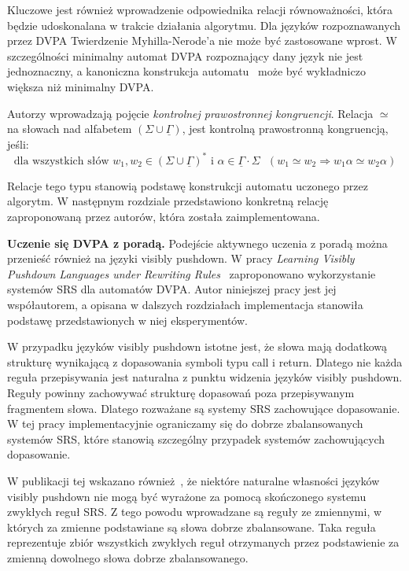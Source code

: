Kluczowe jest również wprowadzenie odpowiednika relacji równoważności, która będzie udoskonalana w trakcie działania algorytmu.
Dla języków rozpoznawanych przez DVPA Twierdzenie Myhilla-Nerode'a nie może być zastosowane wprost. W szczególności minimalny automat DVPA
rozpoznający dany język nie jest jednoznaczny, a kanoniczna konstrukcja automatu~\cite{canonical} może być wykładniczo większa niż minimalny DVPA.

Autorzy wprowadzają pojęcie \emph{kontrolnej prawostronnej kongruencji}. Relacja $\simeq$ na słowach nad alfabetem $(\Sigma \cup \underline{\Gamma})$,
jest kontrolną prawostronną kongruencją, jeśli:
$$\text{dla wszystkich słów }w_1, w_2 \in (\Sigma \cup \underline{\Gamma})^* \text{ i } \alpha \in \underline{\Gamma} \cdot \Sigma \text{ } (w_1 \simeq w_2 \Rightarrow w_1\alpha \simeq w_2\alpha)$$

Relacje tego typu stanowią podstawę konstrukcji automatu uczonego przez algorytm. 
W następnym rozdziale przedstawiono konkretną relację zaproponowaną przez autorów, która została zaimplementowana.

\textbf{Uczenie się DVPA z poradą.}
Podejście aktywnego uczenia z poradą można przenieść również na języki visibly pushdown.
W pracy \textit{Learning Visibly Pushdown Languages under Rewriting Rules}~\cite{SrsDvpa} zaproponowano
wykorzystanie systemów SRS dla automatów DVPA. Autor niniejszej pracy jest jej współautorem,
a opisana w dalszych rozdziałach implementacja stanowiła podstawę przedstawionych w niej eksperymentów.

W przypadku języków visibly pushdown istotne jest, że słowa mają dodatkową strukturę wynikającą z dopasowania
symboli typu call i return. Dlatego nie każda reguła przepisywania jest naturalna z punktu widzenia języków visibly pushdown.
Reguły powinny zachowywać strukturę dopasowań poza przepisywanym fragmentem słowa. Dlatego rozważane są systemy
SRS zachowujące dopasowanie. W tej pracy implementacyjnie ograniczamy się do dobrze zbalansowanych systemów SRS,
które stanowią szczególny przypadek systemów zachowujących dopasowanie.

W publikacji tej wskazano również~\cite[Example 4]{SrsDvpa}, że niektóre naturalne własności języków visibly pushdown
nie mogą być wyrażone za pomocą skończonego systemu zwykłych reguł SRS. Z tego powodu wprowadzane
są reguły ze zmiennymi, w których za zmienne podstawiane są słowa dobrze zbalansowane. Taka reguła reprezentuje
zbiór wszystkich zwykłych reguł otrzymanych przez podstawienie za zmienną dowolnego słowa dobrze zbalansowanego.

